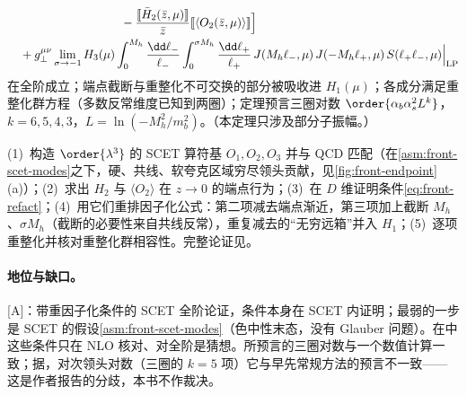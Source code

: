 \begin{theorem}
\begin{equation}
\begin{split}
&\hspace{9.5em}-\frac{[\![\bar H_2(\bar z,\mu)]\!]}{\bar z}[\![\langle O_2(\bar z,\mu)\rangle]\!]\Bigr]\\
&\quad+g_\perp^{\mu\nu}\lim_{\sigma\to-1}H_3(\mu)\int_0^{M_h}\frac{\dd\ell_-}{\ell_-}\int_0^{\sigma M_h}\frac{\dd\ell_+}{\ell_+}\,J(M_h\ell_-,\mu)\,J(-M_h\ell_+,\mu)\,S(\ell_+\ell_-,\mu)\Bigr|_{\rm LP}
\end{split}
\end{equation}
在全阶成立；端点截断与重整化不可交换的部分被吸收进 $H_1(\mu)$；各成分满足重整化群方程（多数反常维度已知到两圈）；定理预言三圈对数 $\order{\alpha_b\alpha_s^2L^k}$，$k=6,5,4,3$，$L=\ln(-M_h^2/m_b^2)$。（本定理只涉及部分子振幅。）
\end{theorem}

\begin{proofsketch}
(1)~构造 $\order{\lambda^3}$ 的 SCET 算符基 $O_1,O_2,O_3$ 并与 QCD 匹配（在\cref{asm:front-scet-modes}之下，硬、共线、软夸克区域穷尽领头贡献，见\cref{fig:front-endpoint}(a)）；(2)~求出 $H_2$ 与 $\langle O_2\rangle$ 在 $z\to0$ 的端点行为；(3)~在 $D$ 维证明条件\cref{eq:front-refact}；(4)~用它们重排因子化公式：第二项减去端点渐近，第三项加上截断 $M_h$、$\sigma M_h$（截断的必要性来自共线反常），重复减去的“无穷远箱”并入 $H_1$；(5)~逐项重整化并核对重整化群相容性。完整论证见\cite{Liu:2019oav,Liu:2020wbn}。
\end{proofsketch}

\paragraph{地位与缺口。}[A]：带重因子化条件的 SCET 全阶论证，条件本身在 SCET 内证明；最弱的一步是 SCET 的假设\cref{asm:front-scet-modes}（色中性末态，没有 Glauber 问题）。在\cite{Liu:2019oav}中这些条件只在 NLO 核对、对全阶是猜想。所预言的三圈对数与一个数值计算一致；据\cite{Liu:2020wbn}，对次领头对数（三圈的 $k=5$ 项）它与早先常规方法的预言不一致——这是作者报告的分歧，本书不作裁决。


